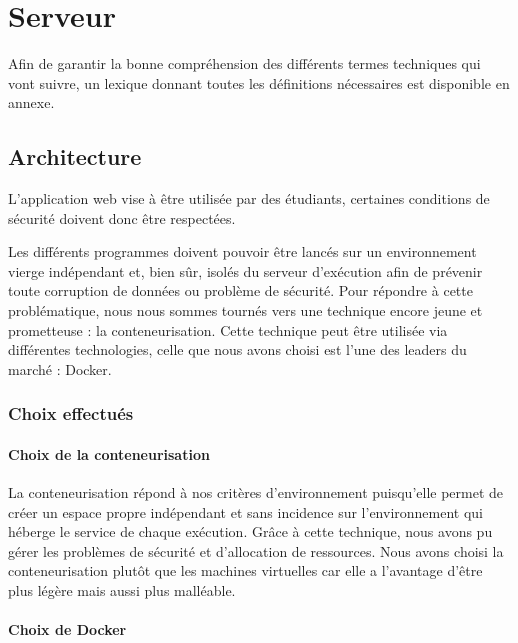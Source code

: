 \chapter{Serveur}

\par Afin de garantir la bonne compréhension des différents termes techniques qui vont suivre, un lexique donnant toutes les définitions nécessaires est disponible en annexe.

\section{Architecture}

\par L’application web vise à être utilisée par des étudiants, certaines conditions de sécurité doivent donc être respectées.
 
\par Les différents programmes doivent pouvoir être lancés sur un environnement vierge indépendant et, bien sûr, isolés du serveur d’exécution afin de prévenir toute corruption de données ou problème de sécurité. Pour répondre à cette problématique, nous nous sommes tournés vers une technique encore jeune et prometteuse : la conteneurisation. Cette technique peut être utilisée via différentes technologies, celle que nous avons choisi est l’une des leaders du marché : Docker.

\subsection{Choix effectués}

\subsubsection{Choix de la conteneurisation}

\par La conteneurisation répond à nos critères d’environnement puisqu’elle permet de créer un espace propre indépendant et sans incidence sur l’environnement qui héberge le \gls{service} de chaque exécution. Grâce à cette technique, nous avons pu gérer les problèmes de sécurité et d’allocation de ressources. Nous avons choisi la conteneurisation plutôt que les machines virtuelles car elle a l’avantage d’être plus légère mais aussi plus malléable.  

\subsubsection{Choix de Docker}

